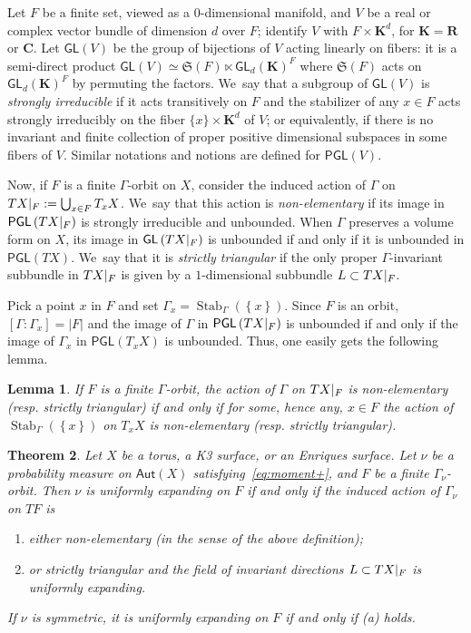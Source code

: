 \documentclass[11pt]{article}
\newcommand{\resp}{resp.\xspace}
\newenvironment{enumeratea}
{\bgroup\def\theenumi{\alph{enumi}}\begin{enumerate}}
{\end{enumerate}\egroup}
\newcommand{\set}[1]{\left\{#1\right\}}
\newcommand{\abs}[1]{\left\vert#1\right\vert}
\newcommand{\rest}[1]{ \arrowvert_{#1}}
\newcommand{\lrpar}[1]{\left(#1\right)}
\DeclareMathOperator{\Stab}{Stab}
\def\C{\mathbf{C}}
\def\R{\mathbf{R}}
\newcommand\Aut{\mathsf{Aut}}
\newcommand\PGL{{\mathsf{PGL}}}
\newcommand\GL{{\mathsf{GL}}}
\theoremstyle{plain}
\newtheorem{thm}{Theorem}[section]
\newtheorem{lem}[thm]{Lemma}
\theoremstyle{definition}
\numberwithin{equation}{section}
\begin{document}
Let $F$ be a finite set, viewed as a $0$-dimensional manifold, and $V$ be a real or complex vector bundle of dimension $d$ over $F$; identify
$V$ with $ F\times \mathbf{K}^d$, for ${\mathbf{K}} = \R$ or $\C$. Let $\GL(V)$ be the group of bijections of $V$ acting linearly on fibers: it is a semi-direct product $\GL(V) \simeq \mathfrak{S}(F) \ltimes \GL_d({\mathbf{K}})^F$ where $\mathfrak{S}(F)$ acts on
$\GL_d({\mathbf{K}})^F$ by permuting the factors. We~say that a subgroup of $\GL(V)$ is \emph{strongly irreducible} if it acts transitively on $F$
and the stabilizer of any $x\in F$ acts strongly irreducibly on the fiber $\{ x\} \times {\mathbf{K}}^d$ of $V$; or equivalently, if there is no invariant and finite collection of proper positive dimensional subspaces in some fibers of $V$. Similar notations and notions are defined for $\PGL(V)$.

Now, if $F$ is a finite $\Gamma$-orbit on $X$,
consider the induced action of $\Gamma$ on $TX\rest{F}:=\bigcup_{x\in F} T_x X$. We~say that this action is \emph{non-elementary}
if its image in $\PGL\lrpar{TX\rest{F}}$ is strongly irreducible and unbounded. When
$\Gamma$ preserves a volume form on $X$, its image in $\GL\lrpar{TX\rest{F}}$ is unbounded if and only if it is unbounded in $\PGL\lrpar{TX}$. We~say that it is \emph{strictly triangular} if the only proper $\Gamma$-invariant subbundle in $T X\rest{F}$ is given by a $1$-dimensional subbundle $L\subset TX\rest{F}$.

Pick a point $x$ in $F$ and set $\Gamma_x = \Stab_{\Gamma}(\set{x})$. Since $F$ is an orbit, $[\Gamma:\Gamma_x]=\abs{F}$ and the image of $\Gamma$ in $\PGL\lrpar{TX\rest{F}}$ is unbounded if and only if the image of $\Gamma_x$ in $\PGL\lrpar{T_xX}$ is unbounded. Thus, one easily gets the following lemma.

\begin{lem}\label{lem:stab_NE}
If $F$ is a finite $\Gamma$-orbit, the action of
$\Gamma$ on $TX\rest{F}$ is non-elementary (\resp strictly triangular) if and only if for some, hence any, $x\in F$
the action of $\Stab_{\Gamma}(\set{x})$ on $T_{x}X$ is non-elementary (\resp strictly triangular).
\end{lem}

\begin{thm}\label{thm:finite_UE}
Let $X$ be a torus, a K3 surface, or an Enriques surface. Let
$\nu$ be a probability measure on $\Aut(X)$ satisfying~\eqref{eq:moment+}, and $F$ be a finite $\Gamma_\nu$-orbit.
Then $\nu$ is uniformly expanding on $F$ if and only if the
induced action of $\Gamma_\nu$ on $TF$ is
\begin{enumeratea}
\item\label{thm:finite_UEa} either non-elementary (in the sense of the above definition);
\item\label{thm:finite_UEb} or strictly triangular and the field of invariant directions $L\subset TX\rest{F}$ is uniformly expanding.
\end{enumeratea}
If $\nu$ is symmetric, it is uniformly expanding on $F$ if and only if (a) holds.
\end{thm}
\end{document}
